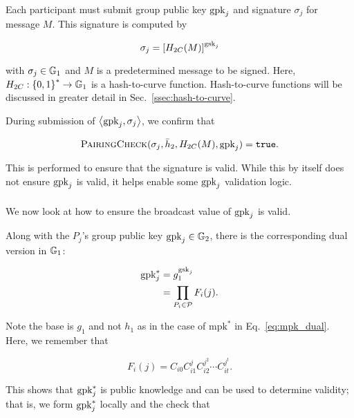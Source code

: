 Each participant must submit group public key $\textrm{gpk}_{j}$
and signature $\sigma_{j}$ for message $M$.
This signature is computed by

\begin{equation}
    \sigma_{j} = \left[ H_{2C}(M) \right]^{\textrm{gsk}_{j}}
\end{equation}

\noindent
with $\sigma_{j}\in\mathbb{G}_{1}$ and $M$ is a predetermined message to be signed.
Here, $H_{2C}:\left\{ 0,1 \right\}^{*}\to\mathbb{G}_{1}$ is a hash-to-curve function.
Hash-to-curve functions will be discussed in greater detail in
Sec.~\ref{ssec:hash-to-curve}.

During submission of $\left\langle \textrm{gpk}_{j},\sigma_{j} \right\rangle$,
we confirm that

\begin{equation}
    \textsc{PairingCheck}(\sigma_{j},\bar{h}_{2},H_{2C}(M),\textrm{gpk}_{j})
        = \texttt{true}.
\end{equation}

\noindent
This is performed to ensure that the signature is valid.
While this by itself does not ensure $\textrm{gpk}_{j}$ is valid,
it helps enable some $\textrm{gpk}_{j}$ validation logic.



\subsubsection{\GPKDispute{}}
\label{app:gpkj_dispute}

We now look at how to ensure the broadcast value of
$\textrm{gpk}_{j}$ is valid.

Along with the $P_{j}$'s group public key $\textrm{gpk}_{j}\in\mathbb{G}_{2}$,
there is the corresponding dual version in $\mathbb{G}_{1}$:

\begin{align}
    \textrm{gpk}_{j}^{*} &= g_{1}^{\textrm{gsk}_{j}}
            \nonumber\\
        &= \prod_{P_{i}\in\mathcal{P}}F_{i}(j).
    \label{eq:gpkj_star_def}
\end{align}

\noindent
Note the base is $g_{1}$ and not $h_{1}$ as in the case of $\text{mpk}^{*}$
in Eq.~\eqref{eq:mpk_dual}.
Here, we remember that

\begin{equation}
    F_{i}(j) = C_{i0}C_{i1}^{j}C_{i2}^{j^{2}}\cdots C_{it}^{j^{t}}.
    \label{eq:Fij_def}
\end{equation}

\noindent
This shows that $\textrm{gpk}_{j}^{*}$ is public knowledge
and can be used to determine validity;
that is, we form $\textrm{gpk}_{j}^{*}$ locally and the check that

